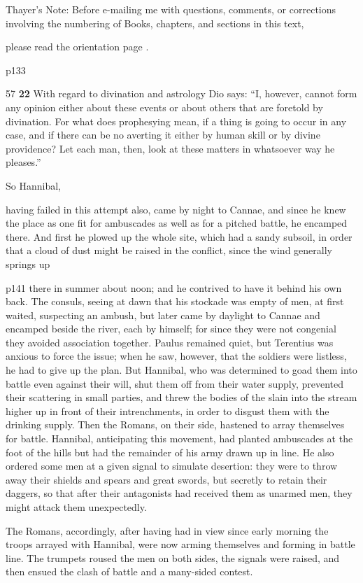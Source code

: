 Thayer's Note: Before e-mailing me with questions, comments, or corrections involving the numbering of Books, chapters, and sections in this text,

please read the orientation page .

p133

57 \textbf{22}
With regard to divination and astrology Dio says: ``I, however, cannot form any opinion either about these events or about others that are foretold by divination. For what does prophesying mean, if a thing is going to occur in any case, and if there can be no averting it either by human skill or by divine providence? Let each man, then, look at these matters in whatsoever way he pleases.''

So Hannibal,

having failed in this attempt also, came by night to Cannae, and since he knew the place as one fit for ambuscades as well as for a pitched battle, he encamped there. And first he plowed up the whole site, which had a sandy subsoil, in order that a cloud of dust might be raised in the conflict, since the wind generally springs up

p141 there in summer about noon; and he contrived to have it behind his own back. The consuls, seeing at dawn that his stockade was empty of men, at first waited, suspecting an ambush, but later came by daylight to Cannae and encamped beside the river, each by himself; for since they were not congenial they avoided association together. Paulus remained quiet, but Terentius was anxious to force the issue; when he saw, however, that the soldiers were listless, he had to give up the plan. But Hannibal, who was determined to goad them into battle even against their will, shut them off from their water supply, prevented their scattering in small parties, and threw the bodies of the slain into the stream higher up in front of their intrenchments, in order to disgust them with the drinking supply. Then the Romans, on their side, hastened to array themselves for battle. Hannibal, anticipating this movement, had planted ambuscades at the foot of the hills but had the remainder of his army drawn up in line. He also ordered some men at a given signal to simulate desertion: they were to throw away their shields and spears and great swords, but secretly to retain their daggers, so that after their antagonists had received them as unarmed men, they might attack them unexpectedly.

The Romans, accordingly, after having had in view since early morning the troops arrayed with Hannibal, were now arming themselves and forming in battle line. The trumpets roused the men on both sides, the signals were raised, and then ensued the clash of battle and a many-sided contest.

